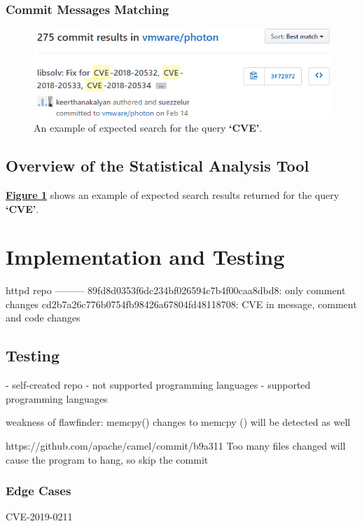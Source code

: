 \documentclass[12pt, a4paper]{report}
\begin{document}
\subsection{Commit Messages Matching}
\begin{figure}[H]
  \centering
  \includegraphics[width=.85\linewidth]{images/keyword_search.png}
  \caption{An example of expected search for the query \textbf{`CVE'}.}
  \label{figure:keyword_search}
\end{figure}

\section{Overview of the Statistical Analysis Tool}

\hyperref[figure:keyword_search]{\textbf{Figure \ref*{figure:keyword_search}}} shows an example of
expected search results returned for the query \textbf{`CVE'}.

\chapter{Implementation and Testing}
httpd repo
---------
89fd8d0353f6dc234bf026594c7b4f00caa8dbd8: only comment changes
cd2b7a26c776b0754fb98426a67804fd48118708: CVE in message, comment and code changes

\section{Testing}
- self-created repo
- not supported programming languages
- supported programming languages

weakness of flawfinder:
memcpy() changes to memcpy () will be detected as well

https://github.com/apache/camel/commit/b9a311
Too many files changed will cause the program to hang, so skip the commit

\subsection{Edge Cases}
CVE-2019-0211
\end{document}
